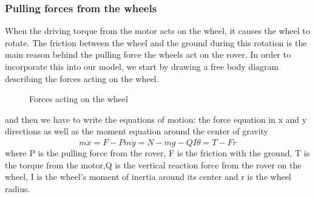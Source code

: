 \documentclass{article}
\begin{document}
	\subsubsection{Pulling forces from the wheels}
	 When the driving torque from the motor acts on the wheel, it causes the wheel to rotate. The friction between the wheel and the ground during this rotation is the main reason behind the pulling force the wheels act on the rover.
	 In order to incorporate this into our model, we start by drawing a free body diagram describing the forces acting on the wheel.
	\begin{figure}[H]
		\centering
		\def\svgwidth{200pt}
		
		\caption{Forces acting on the wheel}
		\label{fig:wheel}
	\end{figure}
	and then we have to write the equations of motion: the force equation in x and y directions as well as the moment equation around the center of gravity
	\begin{subequations}
		\begin{equation}
		m\ddot{x} = F-P
		\label{eqn:xwheel}
		\end{equation}
		\begin{equation}
		m\ddot{y} = N - mg - Q 
		\label{eqn:ywheel}
		\end{equation}
		\begin{equation}
		I\ddot{\theta} = T -Fr
		\label{eqn:rotwheel}
		\end{equation}
		\label{eqn:wheel_eom}
	\end{subequations}
	where P is the pulling force from the rover, F is the friction with the ground, T is the torque from the motor,Q is the vertical reaction force from the rover on the wheel, I is the wheel's moment of inertia around its center and r is the wheel radius. 
	
\end{document}

